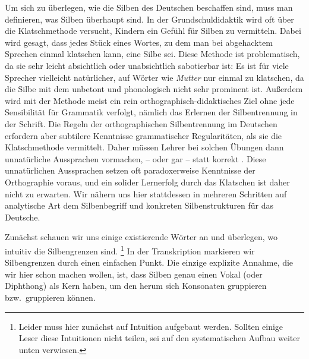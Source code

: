 
Um sich zu überlegen, wie die Silben des Deutschen beschaffen sind, muss man definieren, was Silben überhaupt sind.
In der Grundschuldidaktik wird oft über die Klatschmethode versucht, Kindern ein Gefühl für Silben zu vermitteln.
Dabei wird gesagt, dass jedes Stück eines Wortes, zu dem man bei abgehacktem Sprechen einmal klatschen kann, eine Silbe sei.
Diese Methode ist problematisch, da sie sehr leicht absichtlich oder unabsichtlich sabotierbar ist:
Es ist für viele Sprecher vielleicht natürlicher, auf Wörter wie \textit{Mutter} \textipa{[mUt5]} nur einmal zu klatschen, da die Silbe mit dem \textipa{[5]} unbetont und phonologisch nicht sehr prominent ist.
Außerdem wird mit der Methode meist ein rein orthographisch-didaktisches Ziel ohne jede Sensibilität für Grammatik verfolgt, nämlich das Erlernen der Silbentrennung in der Schrift.
Die Regeln der orthographischen Silbentrennung im Deutschen erfordern aber subtilere Kenntnisse grammatischer Regularitäten, als sie die Klatschmethode vermittelt.
Daher müssen Lehrer bei solchen Übungen dann unnatürliche Aussprachen vormachen, \zB \textipa{[mut]} -- \textipa{[ta]} oder gar \textipa{[mut]} -- \textipa{[tEK]} statt korrekt \textipa{[mUt5]}.
Diese unnatürlichen Aussprachen setzen oft paradoxerweise Kenntnisse der Orthographie voraus, und ein solider Lernerfolg durch das Klatschen ist daher nicht zu erwarten.
Wir nähern uns hier stattdessen in mehreren Schritten auf analytische Art dem Silbenbegriff und konkreten Silbenstrukturen für das Deutsche.

Zunächst schauen wir uns einige existierende Wörter an und überlegen, wo intuitiv die Silbengrenzen sind.%
\footnote{Leider muss hier zunächst auf Intuition aufgebaut werden.
Sollten einige Leser diese Intuitionen nicht teilen, sei auf den systematischen Aufbau weiter unten verwiesen.}
In der Transkription markieren wir Silbengrenzen durch einen einfachen Punkt.
Die einzige explizite Annahme, die wir hier schon machen wollen, ist, dass Silben genau einen Vokal (oder Diphthong) als Kern haben, um den herum sich Konsonaten gruppieren bzw.\ gruppieren können.

\begin{exe}
  \ex\label{ex:phol1830}
  \begin{xlist}
  \end{xlist}
\end{exe}

